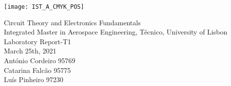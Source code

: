 
\thispagestyle {empty}

\texttt{[image: IST\_A\_CMYK\_POS]}

\begin{center}
%
\vspace{1.0cm}



\vspace{1cm}
{\FontLb Circuit Theory and Electronics Fundamentals} \\ 
\vspace{1cm}
{\FontSn Integrated Master in Aerospace Engineering, Técnico, University of Lisbon} \\ 
\vspace{1cm}
{\FontSn Laboratory Report-T1} \\
\vspace{1cm}
{\FontSn March 25th, 2021} \\ 
\vspace{1cm}
{\FontSn António Cordeiro 95769} \\ 
\vspace{00.5cm}
{\FontSn Catarina Falcão 95775} \\ 
\vspace{0.5cm}
{\FontSn Luís Pinheiro 97230} \\ 
\end{center}


